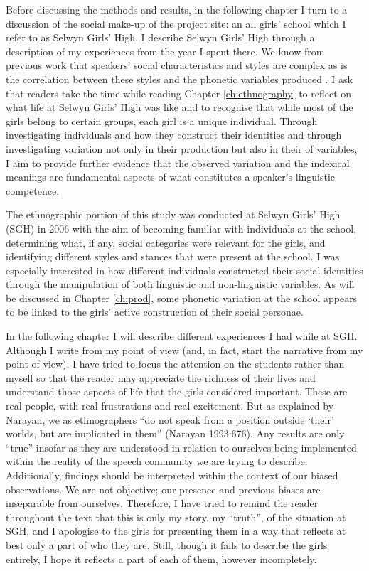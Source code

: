 Before discussing the methods and results, in the following chapter I turn to a discussion of the social make-up of the project site: an all girls' school which I refer to as Selwyn Girls' High.  I describe Selwyn Girls' High through a description of my experiences from the year I spent there.  We know from previous work that speakers' social characteristics and styles are complex as is the correlation between these styles and the phonetic variables produced \cite{eckert2005,eckert1996nailpolish,mendozadenton2008,zhang2005}.  I ask that readers take the time while reading Chapter \ref{ch:ethnography} to reflect on what life at Selwyn Girls' High was like and to recognise that while most of the girls belong to certain groups, each girl is a unique individual.  Through investigating individuals and how they construct their identities and through investigating variation not only in their production but also in their  of variables, I aim to provide further evidence that the observed variation and the indexical meanings are fundamental aspects of what constitutes a speaker's linguistic competence.

The ethnographic portion of this study was conducted at Selwyn Girls' High (SGH) in 2006 with the aim of becoming familiar with individuals at the school, determining what, if any, social categories were relevant for the girls, and identifying different styles and stances that were present at the school.  I was especially interested in how different individuals constructed their social identities through the manipulation of both linguistic and non-linguistic variables.  As will be discussed in Chapter \ref{ch:prod}, some phonetic variation at the school appears to be linked to the girls' active construction of their social personae.  

In the following chapter I will describe different experiences I had while at SGH.  Although I write from my point of view (and, in fact, start the narrative from my point of view), I have tried to focus the attention on the students rather than myself so that the reader may appreciate the richness of their lives and understand those aspects of life that the girls considered important.  These are real people, with real frustrations and real excitement.  But as explained by Narayan, we as ethnographers ``do not speak from a position outside `their' worlds, but are implicated in them'' (Narayan 1993:676).  Any results are only ``true'' insofar as they are understood in relation to ourselves being implemented within the reality of the speech community we are trying to describe.  Additionally, findings should be interpreted within the context of our biased observations.  We are not objective; our presence and previous biases are inseparable from ourselves.  Therefore, I have tried to remind the reader throughout the text that this is only my story, my ``truth'', of the situation at SGH, and I apologise to the girls for presenting them in a way that reflects at best only a part of who they are.  Still, though it fails to describe the girls entirely, I hope it reflects a part of each of them, however incompletely.


